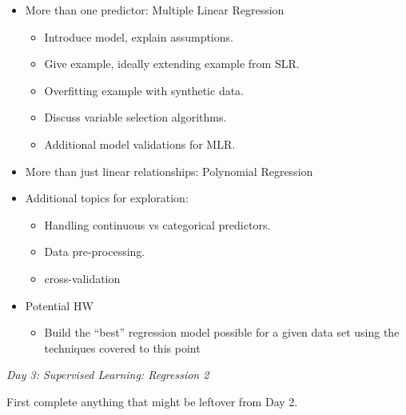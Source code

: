 \documentclass[12pt]{article}
\begin{document}
	\begin{itemize}
		\item More than one predictor: Multiple Linear Regression
		\begin{itemize}
			\item Introduce model, explain assumptions.
			\item Give example, ideally extending example from SLR.
			\item Overfitting example with synthetic data.
			\item Discuss variable selection algorithms.
			\item Additional model validations for MLR.
		\end{itemize}
		\item More than just linear relationships: Polynomial Regression
		\item Additional topics for exploration:
		\begin{itemize}
			\item Handling continuous vs categorical predictors.
			\item Data pre-processing.
			\item cross-validation
		\end{itemize}
		\item Potential HW
		\begin{itemize}
			\item Build the ``best'' regression model possible for a given data set using the techniques covered to this point
		\end{itemize}
	\end{itemize}
	
	
	\vspace{2mm}
	\noindent
	\textit{\large{Day 3: Supervised Learning: Regression 2}}
	
	\noindent
	First complete anything that might be leftover from Day 2.
	
\end{document}
